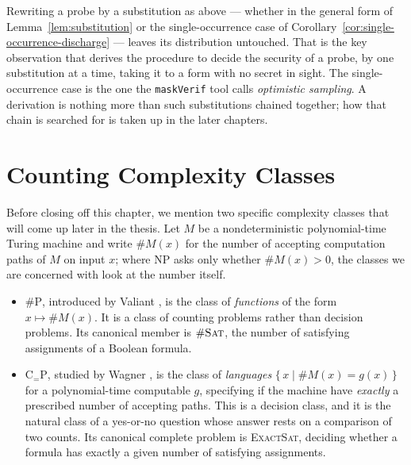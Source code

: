 \begin{remark}
Rewriting a probe by a substitution as above --- whether in the general form of
Lemma~\ref{lem:substitution} or the single-occurrence case of
Corollary~\ref{cor:single-occurrence-discharge} --- leaves its distribution
untouched. That is the key observation that derives the procedure
to decide the security of a probe, by one
substitution at a time, taking it to a form with no secret in sight. The
single-occurrence case is the one the \texttt{maskVerif} tool
\parencite{10.1007/978-3-030-29959-0_15} calls \emph{optimistic sampling}. A
derivation is nothing more than such substitutions chained together; how that
chain is searched for is taken up in the later chapters.
\end{remark}

\section{Counting Complexity Classes}
\label{sec:hardness-preview}


Before closing off this chapter, we mention two specific complexity classes that
will come up later in the thesis. Let $M$ be a nondeterministic polynomial-time
Turing machine and write $\#M(x)$ for the number of accepting computation paths of $M$
on input $x$; where $\mathrm{NP}$ asks only whether $\#M(x) > 0$, the classes we are
concerned with look at the number itself.

\begin{itemize}
  \item $\#\mathrm{P}$, introduced by Valiant \parencite{valiant1979complexity},
  is the class of \emph{functions} of the form $x \mapsto \#M(x)$. It is a class
  of counting problems rather than decision problems. Its canonical member is
  $\#\textsc{Sat}$, the number of satisfying assignments of a Boolean formula.

  \item $\mathrm{C}_{=}\mathrm{P}$, studied by Wagner
  \parencite{wagner1986complexity}, is the class of \emph{languages}
  $\{\, x \mid \#M(x) = g(x) \,\}$ for a polynomial-time computable $g$, specifying if the
  machine have \emph{exactly} a prescribed number of accepting paths. This is a
  decision class, and it is the natural class of a yes-or-no question whose answer
  rests on a comparison of two counts. Its canonical complete problem is
  \textsc{ExactSat}, deciding whether a formula has exactly a given number of
  satisfying assignments.
\end{itemize}

